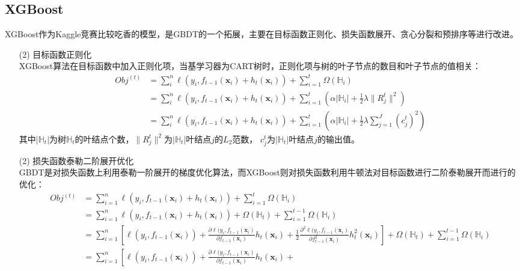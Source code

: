 \documentclass[a4paper]{article}
\begin{document}
	\subsection{XGBoost}
		XGBoost作为Kaggle竞赛比较吃香的模型，是GBDT的一个拓展，主要在目标函数正则化、损失函数展开、贪心分裂和预排序等进行改进。
		\begin{itemize}
			\item[(2)] 目标函数正则化\\
			XGBoost算法在目标函数中加入正则化项，当基学习器为CART树时，正则化项与树的叶子节点的数目和叶子节点的值相关：
			\begin{align*}
				Obj^{(t)} 
					& = \sum_i^n\ell(y_i, f_{t-1}(\textbf{x}_i)+h_t(\textbf{x}_i)) + \sum_{i=1}^t\Omega (\mathbb{H}_i)\\
					& = \sum_i^n\ell\left(y_i, f_{t-1}(\textbf{x}_i)+h_t(\textbf{x}_i)\right) + 
						\sum_{i=1}^t\left(\alpha |\mathbb{H}_i|+\frac{1}{2}\lambda\|R^t_j\|^2\right)\\
					& = \sum_i^n\ell\left(y_i, f_{t-1}(\textbf{x}_i)+h_t(\textbf{x}_i)\right) + 
						\sum_{i=1}^t\left(\alpha |\mathbb{H}_i|+\frac{1}{2}\lambda \sum_{j=1}^{J}(c^t_j)^2\right)
			\end{align*}
				其中$|\mathbb{H}_t|$为树$\mathbb{H}_t$的叶结点个数，$\|R^t_j\|^2$为$|\mathbb{H}_t|$叶结点$j$的$L_2$范数，
				$c^t_j$为$|\mathbb{H}_t|$叶结点$j$的输出值。
			\item[(2)] 损失函数泰勒二阶展开优化\\
			GBDT是对损失函数上利用泰勒一阶展开的梯度优化算法，而XGBoost则对损失函数利用牛顿法对目标函数进行二阶泰勒展开而进行的优化：
			\begin{align*}
				Obj^{(t)} 
					& = \sum_{i=1}^n\ell(y_i, f_{t-1}(\textbf{x}_i)+h_t(\textbf{x}_i)) + \sum_{i=1}^t\Omega (\mathbb{H}_i)\\
					& = \sum_{i=1}^n\ell(y_i, f_{t-1}(\textbf{x}_i)+h_t(\textbf{x}_i)) + \Omega(\mathbb{H}_t) + \sum_{i=1}^{t-1}\Omega (\mathbb{H}_i)\\
					& = \sum_{i=1}^n\left[\ell(y_i,f_{t-1}(\textbf{x}_i))+
										\frac{\partial\ell(y_i,f_{t-1}(\textbf{x}_i)}{\partial f_{t-1}(\textbf{x}_i)}h_t(\textbf{x}_i)+
										\frac{1}{2}\frac{\partial^2\ell(y_i,f_{t-1}(\textbf{x}_i)}{\partial f^2_{t-1}(\textbf{x}_i)}h^2_t(\textbf{x}_i)
										\right] + \Omega(\mathbb{H}_t) + \sum_{i=1}^{t-1}\Omega(\mathbb{H}_i)\\
					& = \sum_{i=1}^n\left[\ell(y_i,f_{t-1}(\textbf{x}_i))+
										\frac{\partial\ell(y_i,f_{t-1}(\textbf{x}_i)}{\partial f_{t-1}(\textbf{x}_i)}h_t(\textbf{x}_i)+

\end{align*}
\end{itemize}
\end{document}
